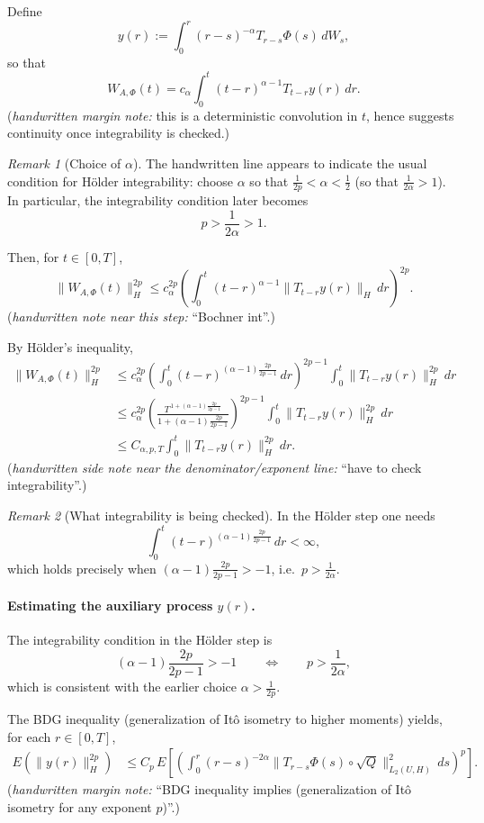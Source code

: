 \documentclass[11pt]{article}
\theoremstyle{definition}
\theoremstyle{remark}
\newtheorem{remark}{Remark}
\begin{document}
Define
\[
y(r)
:=
\int_0^r (r-s)^{-\alpha}T_{r-s}\Phi(s)\,dW_s,
\]
so that
\[
W_{A,\Phi}(t)
=
c_\alpha\int_0^t (t-r)^{\alpha-1}T_{t-r}y(r)\,dr.
\]
\noindent
(\emph{handwritten margin note:} this is a deterministic convolution in $t$, hence suggests continuity once integrability is checked.)

\begin{remark}[Choice of $\alpha$]
The handwritten line appears to indicate the usual condition for Hölder integrability:
choose $\alpha$ so that $\frac{1}{2p}<\alpha<\frac12$ (so that $\frac{1}{2\alpha}>1$). In particular, the integrability condition later becomes
\[
p>\frac{1}{2\alpha}>1.
\]
\end{remark}

Then, for $t\in[0,T]$,
\[
\|W_{A,\Phi}(t)\|_H^{2p}
\le
c_\alpha^{2p}
\left(
\int_0^t (t-r)^{\alpha-1}\|T_{t-r}y(r)\|_H\,dr
\right)^{2p}.
\]
\noindent
(\emph{handwritten note near this step:} ``Bochner int''.)

By H\"older's inequality,
\[
\begin{aligned}
	\|W_{A,\Phi}(t)\|_H^{2p}
	&\le
	c_\alpha^{2p}
	\left(
	\int_0^t
	(t-r)^{(\alpha-1)\frac{2p}{2p-1}}
	\,dr
	\right)^{2p-1}
	\int_0^t \|T_{t-r}y(r)\|_H^{2p}\,dr \\
&\le
c_\alpha^{2p}
\left(
\frac{T^{\,1+(\alpha-1)\frac{2p}{2p-1}}}
{1+(\alpha-1)\frac{2p}{2p-1}}
\right)^{2p-1}
	\int_0^t \|T_{t-r}y(r)\|_H^{2p}\,dr \\
&\le
C_{\alpha,p,T}
	\int_0^t \|T_{t-r}y(r)\|_H^{2p}\,dr.
\end{aligned}
\]
\noindent
(\emph{handwritten side note near the denominator/exponent line:} ``have to check integrability''.)

\begin{remark}[What integrability is being checked]
In the H\"older step one needs
\[
    \int_0^t (t-r)^{(\alpha-1)\frac{2p}{2p-1}}\,dr < \infty,
\]
which holds precisely when $(\alpha-1)\frac{2p}{2p-1}>-1$, i.e.\ $p>\frac{1}{2\alpha}$.
\end{remark}

\paragraph{Estimating the auxiliary process $y(r)$.}
The integrability condition in the H\"older step is
\[
(\alpha-1)\frac{2p}{2p-1} > -1
\qquad\Longleftrightarrow\qquad
p > \frac{1}{2\alpha},
\]
which is consistent with the earlier choice $\alpha>\frac{1}{2p}$.

The BDG inequality (generalization of It\^o isometry to higher moments) yields, for each $r\in[0,T]$,
\[
\begin{aligned}
E\!\left(\|y(r)\|_H^{2p}\right)
&\le
C_p\,
E\!\left[
\left(
\int_0^r
(r-s)^{-2\alpha}
\bigl\|T_{r-s}\Phi(s)\circ\sqrt{Q}\bigr\|_{L_2(U,H)}^2
\,ds
\right)^p
\right].
\end{aligned}
\]
\noindent
(\emph{handwritten margin note:} ``BDG inequality implies (generalization of It\^o isometry for any exponent $p$)''.)
\end{document}
